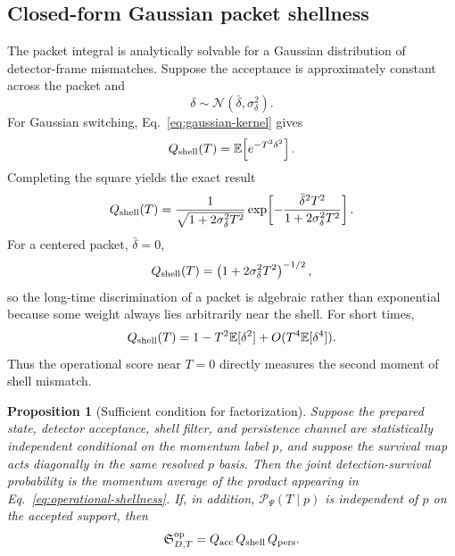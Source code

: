 \documentclass[11pt]{article}
\newtheorem{proposition}{Proposition}
\theoremstyle{remark}
\newcommand{\Sop}{\mathfrak S}
\newcommand{\Persist}{\mathcal P}
\begin{document}
\subsection{Closed-form Gaussian packet shellness}
The packet integral is analytically solvable for a Gaussian distribution of detector-frame mismatches. Suppose the acceptance is approximately constant across the packet and
\begin{equation}
 \delta\sim\mathcal N(\bar\delta,\sigma_\delta^2).
\end{equation}
For Gaussian switching, Eq.~\eqref{eq:gaussian-kernel} gives
\begin{equation}
 Q_{\rm shell}(T)
 =\mathbb E\!\left[e^{-T^2\delta^2}\right].
\end{equation}
Completing the square yields the exact result
\begin{equation}
 Q_{\rm shell}(T)
 =\frac{1}{\sqrt{1+2\sigma_\delta^2T^2}}
 \exp\!\left[-\frac{\bar\delta^2T^2}
 {1+2\sigma_\delta^2T^2}\right].
 \label{eq:gaussian-packet-shellness}
\end{equation}
For a centered packet, $\bar\delta=0$,
\begin{equation}
 Q_{\rm shell}(T)=\left(1+2\sigma_\delta^2T^2\right)^{-1/2},
\end{equation}
so the long-time discrimination of a packet is algebraic rather than exponential because some weight always lies arbitrarily near the shell. For short times,
\begin{equation}
 Q_{\rm shell}(T)
 =1-T^2\mathbb E[\delta^2]+O(T^4\mathbb E[\delta^4]).
 \label{eq:packet-moment-expansion}
\end{equation}
Thus the operational score near $T=0$ directly measures the second moment of shell mismatch.

\begin{proposition}[Sufficient condition for factorization]
Suppose the prepared state, detector acceptance, shell filter, and persistence channel are statistically independent conditional on the momentum label $p$, and suppose the survival map acts diagonally in the same resolved $p$ basis. Then the joint detection-survival probability is the momentum average of the product appearing in Eq.~\eqref{eq:operational-shellness}. If, in addition, $\Persist_\Psi(T\mid p)$ is independent of $p$ on the accepted support, then
\begin{equation}
 \Sop^{\rm op}_{D,T}
 =Q_{\rm acc}\,Q_{\rm shell}\,Q_{\rm pers}.
 \label{eq:exact-factorization-condition}
\end{equation}
\end{proposition}
\end{document}
